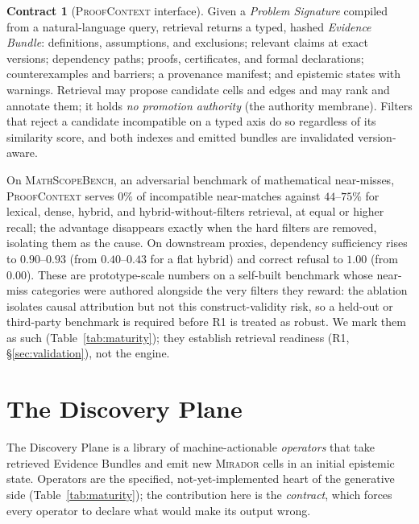 \documentclass[11pt]{amsart}
\theoremstyle{definition}
\newtheorem{contract}{Contract}[section]
\theoremstyle{remark}
\newcommand{\mirador}{\textsc{Mirador}}
\newcommand{\pc}{\textsc{ProofContext}}
\begin{document}
\begin{contract}[\pc{} interface]\label{con:pc}
Given a \emph{Problem Signature} compiled from a natural-language query,
retrieval returns a typed, hashed \emph{Evidence Bundle}: definitions,
assumptions, and exclusions; relevant claims at exact versions; dependency
paths; proofs, certificates, and formal declarations; counterexamples and
barriers; a provenance manifest; and epistemic states with warnings. Retrieval
may propose candidate cells and edges and may rank and annotate them; it holds
\emph{no promotion authority} (the authority membrane). Filters that reject a
candidate incompatible on a typed axis do so regardless of its similarity score,
and both indexes and emitted bundles are invalidated version-aware.
\end{contract}

On \textsc{MathScopeBench}, an adversarial benchmark of mathematical near-misses,
\pc{} serves $0\%$ of incompatible near-matches against $44$--$75\%$ for lexical,
dense, hybrid, and hybrid-without-filters retrieval, at equal or higher recall;
the advantage disappears exactly when the hard filters are removed, isolating
them as the cause. On downstream proxies, dependency sufficiency rises to
$0.90$--$0.93$ (from $0.40$--$0.43$ for a flat hybrid) and correct refusal to
$1.00$ (from $0.00$). These are prototype-scale numbers on a self-built
benchmark whose near-miss categories were authored alongside the very filters
they reward: the ablation isolates causal attribution but not this
construct-validity risk, so a held-out or third-party benchmark is required
before R1 is treated as robust. We mark them as such (Table~\ref{tab:maturity});
they establish retrieval readiness (R1, \S\ref{sec:validation}), not the engine.

\section{The Discovery Plane}\label{sec:discovery}

The Discovery Plane is a library of machine-actionable \emph{operators} that
take retrieved Evidence Bundles and emit new \mirador{} cells in an initial
epistemic state. Operators are the specified, not-yet-implemented heart of the
generative side (Table~\ref{tab:maturity}); the contribution here is the
\emph{contract}, which forces every operator to declare what would make its
output wrong.
\end{document}

